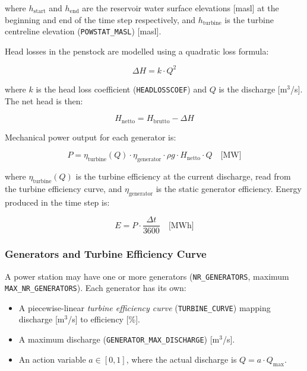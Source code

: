 \documentclass[a4paper, 12pt]{report}
\begin{document}
	where $h_\mathrm{start}$ and $h_\mathrm{end}$ are the reservoir water surface elevations
	[masl] at the beginning and end of the time step respectively, and $h_\mathrm{turbine}$ is
	the turbine centreline elevation (\texttt{POWSTAT\_MASL}) [masl].

	Head losses in the penstock are modelled using a quadratic loss formula:

	\begin{equation}
	    \Delta H = k \cdot Q^2
        \label{eq:Headloss}
	\end{equation}
	

	where $k$ is the head loss coefficient (\texttt{HEADLOSSCOEF}) and $Q$ is the discharge
	[m$^3$/s]. The net head is then:


	\begin{equation}
	    H_\mathrm{netto} = H_\mathrm{brutto} - \Delta H
        \label{eq:Head_net}
	\end{equation}

	Mechanical power output for each generator is:

	\begin{equation}
	    P = \eta_\mathrm{turbine}(Q) \cdot \eta_\mathrm{generator} \cdot \rho g \cdot H_\mathrm{netto} \cdot Q \quad \text{[MW]}
        \label{eq:Gen_Mech_power}
	\end{equation}
	

	where $\eta_\mathrm{turbine}(Q)$ is the turbine efficiency at the current discharge, read from
	the turbine efficiency curve, and $\eta_\mathrm{generator}$ is the static generator efficiency.
	Energy produced in the time step is:

	$$
	E = P \cdot \frac{\Delta t}{3600} \quad \text{[MWh]}
	$$


	\subsubsection{Generators and Turbine Efficiency Curve}
	A power station may have one or more generators (\texttt{NR\_GENERATORS}, maximum
	\texttt{MAX\_NR\_GENERATORS}). Each generator has its own:

	\begin{itemize}
		\item A piecewise-linear \emph{turbine efficiency curve} (\texttt{TURBINE\_CURVE})
		mapping discharge [m$^3$/s] to efficiency [\%].
		\item A maximum discharge (\texttt{GENERATOR\_MAX\_DISCHARGE}) [m$^3$/s].
		\item An action variable $a \in [0, 1]$, where the actual discharge is
		$Q = a \cdot Q_\mathrm{max}$.
	\end{itemize}
\end{document}
